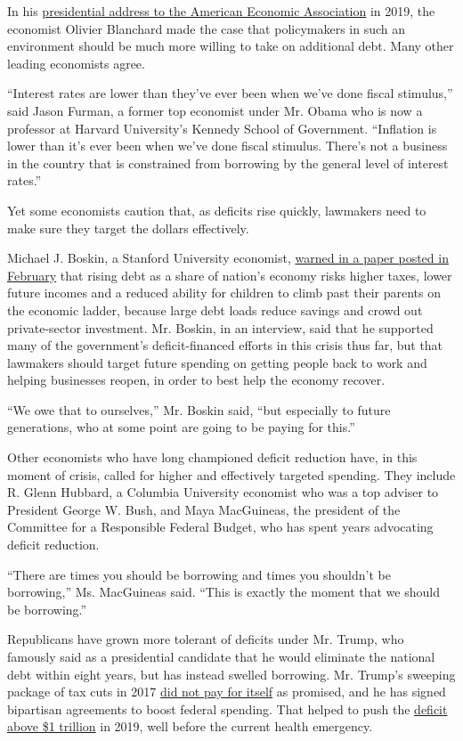 In his
\href{https://www.piie.com/commentary/speeches-papers/public-debt-and-low-interest-rates}{presidential
address to the American Economic Association} in 2019, the economist
Olivier Blanchard made the case that policymakers in such an environment
should be much more willing to take on additional debt. Many other
leading economists agree.

``Interest rates are lower than they've ever been when we've done fiscal
stimulus,'' said Jason Furman, a former top economist under Mr. Obama
who is now a professor at Harvard University's Kennedy School of
Government. ``Inflation is lower than it's ever been when we've done
fiscal stimulus. There's not a business in the country that is
constrained from borrowing by the general level of interest rates.''

Yet some economists caution that, as deficits rise quickly, lawmakers
need to make sure they target the dollars effectively.

Michael J. Boskin, a Stanford University economist,
\href{https://www.nber.org/papers/w26727}{warned in a paper posted in
February} that rising debt as a share of nation's economy risks higher
taxes, lower future incomes and a reduced ability for children to climb
past their parents on the economic ladder, because large debt loads
reduce savings and crowd out private-sector investment. Mr. Boskin, in
an interview, said that he supported many of the government's
deficit-financed efforts in this crisis thus far, but that lawmakers
should target future spending on getting people back to work and helping
businesses reopen, in order to best help the economy recover.

``We owe that to ourselves,'' Mr. Boskin said, ``but especially to
future generations, who at some point are going to be paying for this.''

Other economists who have long championed deficit reduction have, in
this moment of crisis, called for higher and effectively targeted
spending. They include R. Glenn Hubbard, a Columbia University economist
who was a top adviser to President George W. Bush, and Maya MacGuineas,
the president of the Committee for a Responsible Federal Budget, who has
spent years advocating deficit reduction.

``There are times you should be borrowing and times you shouldn't be
borrowing,'' Ms. MacGuineas said. ``This is exactly the moment that we
should be borrowing.''

Republicans have grown more tolerant of deficits under Mr. Trump, who
famously said as a presidential candidate that he would eliminate the
national debt within eight years, but has instead swelled borrowing. Mr.
Trump's sweeping package of tax cuts in 2017
\href{https://www.nytimes3xbfgragh.onion/2019/01/11/business/trump-tax-cuts-revenue.html}{did
not pay for itself} as promised, and he has signed bipartisan agreements
to boost federal spending. That helped to push the
\href{https://www.nytimes3xbfgragh.onion/2020/01/13/business/budget-deficit-1-trillion-trump.html}{deficit
above \$1 trillion} in 2019, well before the current health emergency.

